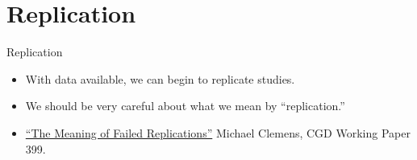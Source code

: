 \documentclass{beamer}
\begin{document}
\section{Replication}
\begin{frame}{Replication}
\begin{itemize}
\item
With data available, we can begin to replicate studies.

\item 
We should be very careful about what we mean by ``replication.''

\item \href{http://www.cgdev.org/sites/default/files/CGD-Working-Paper-399-Clemens-Meaning-Failed-Replications.pdf}{``The Meaning of Failed Replications''} Michael Clemens, CGD Working Paper 399.
\end{itemize}
\end{frame}


{ %
    \begin{frame}[plain]
     \end{frame}
}
\end{document}
